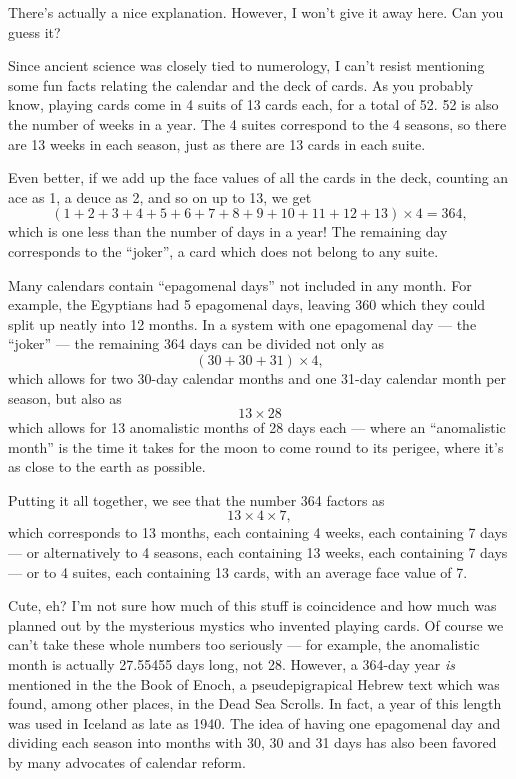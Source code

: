 \documentclass{article}
\begin{document}
There's actually a nice explanation. However, I won't give it away here.
Can you guess it?

Since ancient science was closely tied to numerology, I can't resist
mentioning some fun facts relating the calendar and the deck of cards.
As you probably know, playing cards come in 4 suits of 13 cards each,
for a total of 52. 52 is also the number of weeks in a year. The 4
suites correspond to the 4 seasons, so there are 13 weeks in each
season, just as there are 13 cards in each suite.

Even better, if we add up the face values of all the cards in the deck,
counting an ace as 1, a deuce as 2, and so on up to 13, we get
\[(1 + 2 + 3 + 4 + 5 + 6 + 7 + 8 + 9 + 10 + 11 + 12 + 13) \times 4 = 364,\]
which is one less than the number of days in a year! The remaining day
corresponds to the ``joker'', a card which does not belong to any suite.

Many calendars contain ``epagomenal days'' not included in any month.
For example, the Egyptians had 5 epagomenal days, leaving 360 which they
could split up neatly into 12 months. In a system with one epagomenal
day --- the ``joker'' --- the remaining 364 days can be divided not only
as \[(30 + 30 + 31) \times 4,\] which allows for two 30-day calendar
months and one 31-day calendar month per season, but also as
\[13 \times 28\] which allows for 13 anomalistic months of 28 days each
--- where an ``anomalistic month'' is the time it takes for the moon to
come round to its perigee, where it's as close to the earth as possible.

Putting it all together, we see that the number 364 factors as
\[13 \times 4 \times 7,\] which corresponds to 13 months, each
containing 4 weeks, each containing 7 days --- or alternatively to 4
seasons, each containing 13 weeks, each containing 7 days --- or to 4
suites, each containing 13 cards, with an average face value of 7.

Cute, eh? I'm not sure how much of this stuff is coincidence and how
much was planned out by the mysterious mystics who invented playing
cards. Of course we can't take these whole numbers too seriously --- for
example, the anomalistic month is actually 27.55455 days long, not 28.
However, a 364-day year \emph{is} mentioned in the the Book of Enoch, a
pseudepigrapical Hebrew text which was found, among other places, in the
Dead Sea Scrolls. In fact, a year of this length was used in Iceland as
late as 1940. The idea of having one epagomenal day and dividing each
season into months with 30, 30 and 31 days has also been favored by many
advocates of calendar reform.
\end{document}
